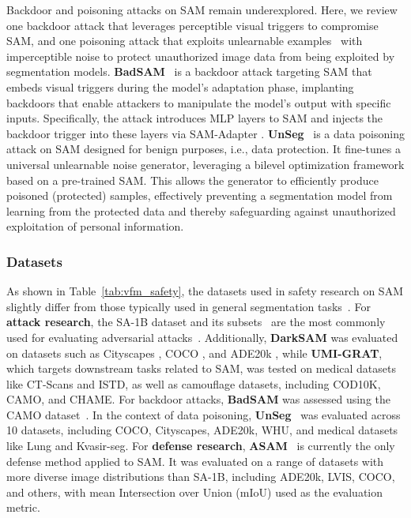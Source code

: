 Backdoor and poisoning attacks on SAM remain underexplored. Here, we review one backdoor attack that leverages perceptible visual triggers to compromise SAM, and one poisoning attack that exploits unlearnable examples~\cite{huang2021unlearnable} with imperceptible noise to protect unauthorized image data from being exploited by segmentation models.
\textbf{BadSAM}~\cite{guan2024badsam} is a backdoor attack targeting SAM that embeds visual triggers during the model's adaptation phase, implanting backdoors that enable attackers to manipulate the model's output with specific inputs. Specifically, the attack introduces MLP layers to SAM and injects the backdoor trigger into these layers via SAM-Adapter \cite{chen2023sam}.
\textbf{UnSeg}~\cite{sun2024unseg} is a data poisoning attack on SAM designed for benign purposes, i.e., data protection. It fine-tunes a universal unlearnable noise generator, leveraging a bilevel optimization framework based on a pre-trained SAM. This allows the generator to efficiently produce poisoned (protected) samples, effectively preventing a segmentation model from learning from the protected data and thereby safeguarding against unauthorized exploitation of personal information.



\subsubsection{Datasets}\label{sec:SAM-dataset}

As shown in Table~\ref{tab:vfm_safety}, the datasets used in safety research on SAM slightly differ from those typically used in general segmentation tasks~\cite{MOSE,MeViS}. 
For \textbf{attack research}, the SA-1B dataset and its subsets~\cite{kirillov2023segment} are the most commonly used for evaluating adversarial attacks~\cite{croce2024segment, han2023segment, lu2024unsegment, shen2024practical, zhang2023attack, zheng2023black}.
Additionally, \textbf{DarkSAM} was evaluated on datasets such as Cityscapes \cite{cordts2016cityscapes}, COCO \cite{lin2014microsoft}, and ADE20k \cite{zhou2017scene}, while \textbf{UMI-GRAT}, which targets downstream tasks related to SAM, was tested on medical datasets like CT-Scans and ISTD, as well as camouflage datasets, including COD10K, CAMO, and CHAME. For backdoor attacks, \textbf{BadSAM} was assessed using the CAMO dataset~\cite{le2019anabranch}. In the context of data poisoning, \textbf{UnSeg}~\cite{sun2024unseg} was evaluated across 10 datasets, including COCO, Cityscapes, ADE20k, WHU, and medical datasets like Lung and Kvasir-seg.
For \textbf{defense research}, \textbf{ASAM}~\cite{li2024asam} is currently the only defense method applied to SAM. It was evaluated on a range of datasets with more diverse image distributions than SA-1B, including ADE20k, LVIS, COCO, and others, with mean Intersection over Union (mIoU) used as the evaluation metric.
